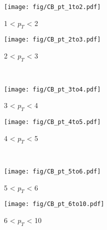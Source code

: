            \begin{figure}[htbp]
                \centering
                \begin{minipage}{0.45\textwidth}
                    \centering
                    \texttt{[image: fig/CB\_pt\_1to2.pdf]}
                    \caption{1 < $p_{T}$ < 2}
                    \label{fig:CB_1to2}
                \end{minipage}
                \hfill
                \begin{minipage}{0.45\textwidth}
                    \centering
                    \texttt{[image: fig/CB\_pt\_2to3.pdf]}
                    \caption{2 < $p_{T}$ < 3}
                    \label{fig:CB_2to3}
                \end{minipage}
                \\
                \vspace{1em}
                \begin{minipage}{0.45\textwidth}
                    \centering
                    \texttt{[image: fig/CB\_pt\_3to4.pdf]}
                    \caption{3 < $p_{T}$ < 4}
                    \label{fig:CB_3to4}
                \end{minipage}
                \hfill
                \begin{minipage}{0.45\textwidth}
                    \centering
                    \texttt{[image: fig/CB\_pt\_4to5.pdf]}
                    \caption{4 < $p_{T}$ < 5}
                    \label{fig:CB_4to5}
                \end{minipage}
                \\
                \vspace{1em}
                \begin{minipage}{0.45\textwidth}
                    \centering
                    \texttt{[image: fig/CB\_pt\_5to6.pdf]}
                    \caption{5 < $p_{T}$ < 6}
                    \label{fig:CB_5to6}
                \end{minipage}
                \hfill
                \begin{minipage}{0.45\textwidth}
                    \centering
                    \texttt{[image: fig/CB\_pt\_6to10.pdf]}
                    \caption{6 < $p_{T}$ < 10}
                    \label{fig:CB_6to10}
                \end{minipage}
                \label{fig:CB_pt_separation}
            \end{figure}

